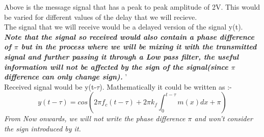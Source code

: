 \documentclass[12pt]{article}
\begin{document}
\begin{flushleft}
Above is the message signal that has a peak to peak amplitude of 2V. This would be varied for different values of the delay that we will recieve.\\
The signal that we will receive would be a delayed version of the signal y(t). \\
\textit{\textbf{Note that the signal so received would also contain a phase difference of $\pi$ but in the process where we will be mixing it with the transmitted signal and further passing it through a Low pass filter, the useful information will not be affected by the sign of the signal(since $\pi$ difference can only change sign). }}'
\\
Received signal would be y(t-$\tau$). Mathematically it could be written as :- \[y(t-\tau)  = cos(2\pi f_c(t-\tau) + 2\pi k_f \int_{0}^{t- \tau} m(x) dx + \pi ) \]
\textit{From Now onwards, we will not write the phase difference $\pi$ and won't consider the sign introduced by it. \\}


\end{flushleft}
\end{document}
